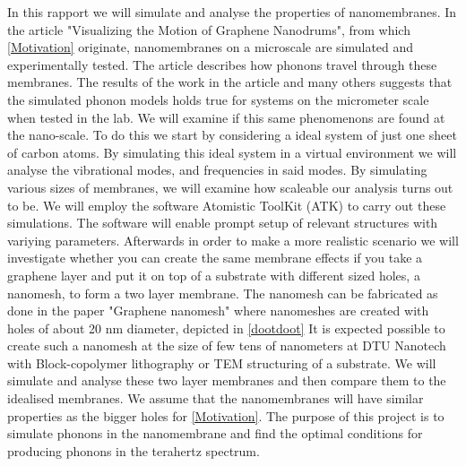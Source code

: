 In this rapport we will simulate and analyse the properties of nanomembranes. In the article "Visualizing the Motion of Graphene Nanodrums"\cite{Davidovikj2016}, from which \cref{Motivation} originate, nanomembranes on a microscale are simulated and experimentally tested. The article describes how phonons travel through these membranes. The results of the work in the article and many others suggests that the simulated phonon models holds true for systems on the micrometer scale when tested in the lab. We will examine if this same phenomenons are found at the nano-scale. To do this we start by considering a ideal system of just one sheet of carbon atoms. By simulating this ideal system in a virtual environment we will analyse the vibrational modes, and frequencies in said modes. By simulating various sizes of membranes, we will examine how scaleable our analysis turns out to be.
We will employ the software Atomistic ToolKit (ATK)\cite{QuantumWise} to carry out these simulations. The
software will enable prompt setup of relevant structures with variying parameters.
Afterwards in order to make a more realistic scenario we will investigate whether you can create the same membrane effects if you take a graphene layer and put it on top of a substrate with different sized holes, a nanomesh, to form a two layer membrane.
The nanomesh can be fabricated as done in the paper "Graphene nanomesh"\cite{Bai2010} where nanomeshes are created with holes of about 20 nm diameter, depicted in \cref{dootdoot}
It is expected possible to create such a nanomesh at the
size of few tens of nanometers at DTU Nanotech with Block-copolymer lithography or TEM
structuring of a substrate.
We will simulate and analyse these two layer membranes and then compare them to the idealised membranes.
We assume that the nanomembranes will have similar properties as the bigger holes for \cref{Motivation}.
The purpose of this project is to
simulate phonons in the nanomembrane and find the optimal conditions for producing
phonons in the terahertz spectrum.
